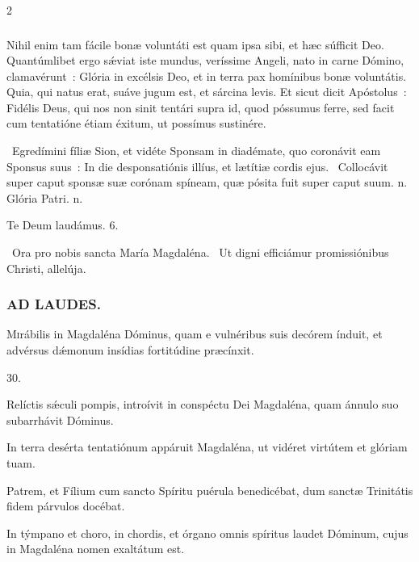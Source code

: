 \documentclass[9pt,twoside]{extarticle}
\begin{document}
\begin{multicols}{2}
{\subsubsection*{\center {}}
Nihil enim tam fácile bonæ voluntáti est quam ipsa sibi, et hæc súfficit Deo. Quantúmlibet ergo sǽviat iste mundus, veríssime Angeli, nato in carne Dómino, clamavérunt~: Glória in excélsis Deo, et in terra pax homínibus bonæ voluntátis. Quia, qui natus erat, suáve jugum est, et sárcina levis. Et sicut dicit Apóstolus~: Fidélis Deus, qui nos non sinit tentári supra id, quod póssumus ferre, sed facit cum tentatióne étiam éxitum, ut possímus sustinére.

\begin{tightlist}{}
\item {}~Egredímini fíliæ Sion, et vidéte Sponsam in diadémate, quo coronávit eam Sponsus suus~: \textred{*} In die desponsatiónis illíus, et lætítiæ cordis ejus. ~Collocávit super caput sponsæ suæ corónam spíneam, quæ pósita fuit super caput suum. n. Glória Patri. n.
\item Te Deum laudámus. 6.
\item {}~Ora pro nobis sancta María Magdaléna. ~Ut digni efficiámur promissiónibus Christi, allelúja.
\end{tightlist}

\subsubsection*{\center \textsc{AD LAUDES.}}
\begin{center}\end{center}
\lettrine{M}irábilis in Magdaléna Dóminus, quam e vulnéribus suis decórem índuit, et advérsus dǽmonum insídias fortitúdine præcínxit.

\begin{tightlist}{}
\item {} 30.
\item {} Relíctis sǽculi pompis, introívit in conspéctu Dei Magdaléna, quam ánnulo suo subarrhávit Dóminus.
\item {} In terra desérta tentatiónum appáruit Magdaléna, ut vidéret virtútem et glóriam tuam.
\item {} Patrem, et Fílium cum sancto Spíritu puérula benedicébat, dum sanctæ Trinitátis fidem párvulos docébat.
\item {} In týmpano et choro, in chordis, et órgano omnis spíritus laudet Dóminum, cujus in Magdaléna nomen exaltátum est.
\end{tightlist}

}
\end{multicols}
\end{document}
